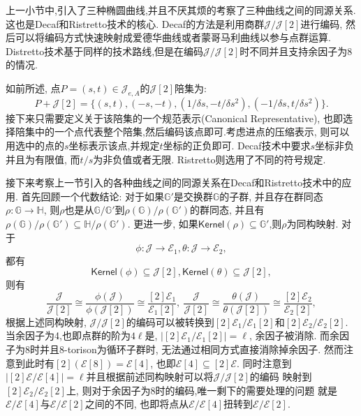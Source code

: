 \documentclass{article}
\renewcommand{\G}{\mathbb{G}}
\newcommand{\E}{\mathcal{E}}
\newcommand{\J}{\mathcal{J}}
\newcommand{\Kernel}{\textsf{Kernel}}
\begin{document}
上一小节中,引入了三种椭圆曲线,并且不厌其烦的考察了三种曲线之间的同源关系.
这也是Decaf和Ristretto技术的核心. Decaf的方法是利用商群$\J/\J[2]$进行编码,
然后可以将编码方式快速映射成爱德华曲线或者蒙哥马利曲线以参与点群运算. 
Distretto技术基于同样的技术路线,但是在编码$\J/\J[2]$时不同并且支持余因子为8的情况.

如前所述, 点$P = (s,t) \in \J_{e, A}$的$\J[2]$陪集为:
$$
P + \J[2] = \{(s,t), (-s, -t), (1/\delta s, -t/\delta s^2), (-1 / \delta s, t / \delta s^2) \}.
$$
接下来只需要定义关于该陪集的一个规范表示(Canonical Representative), 
也即选择陪集中的一个点代表整个陪集,然后编码该点即可.考虑进点的压缩表示,
则可以用选中的点的$s$坐标表示该点,并规定$t$坐标的正负即可.
Decaf技术中要求$s$坐标非负并且为有限值, 而$t/s$为非负值或者无限.
Ristretto则选用了不同的符号规定.

接下来考察上一节引入的各种曲线之间的同源关系在Decaf和Ristretto技术中的应用.
首先回顾一个代数结论: 对于如果$\G'$是交换群$\G$的子群, 并且存在群同态
$\rho: \G \rightarrow \mathbb{H}$, 则$\rho$也是从$\G/\G'$到$\rho(\G)/\rho(\G')$的群同态,
并且有$\rho(\G)/\rho(\G') \subseteq \mathbb{H}/\rho(\G')$.
更进一步, 如果$\Kernel(\rho) \subseteq \G'$,则$\rho$为同构映射.
对于
$$\phi: \J \rightarrow \E_1, \theta: \J \rightarrow \E_2,$$ 
都有
$$\Kernel(\phi) \subseteq \J[2], \Kernel(\theta) \subseteq \J[2],$$
则有
$$
\frac{\J}{\J[2]} \cong \frac{\phi(\J)}{\phi(\J[2])} \cong \frac{[2]\E_1}{\E_1[2]}, \ 
\frac{\J}{\J[2]} \cong \frac{\theta(\J)}{\theta(\J[2])} \cong \frac{[2]\E_2}{\E_2[2]},
$$
根据上述同构映射, $\J/\J[2]$的编码可以被转换到$[2]\E_1/\E_1[2]$和$[2]\E_2/\E_2[2]$.
当余因子为4,也即点群的阶为$4\ell$是, $|[2]\E_1/\E_1[2]| = \ell$, 余因子被消除.
而余因子为8时并且8-torison为循环子群时, 无法通过相同方式直接消除掉余因子.
然而注意到此时有$[2](\E[8]) = \E[4]$, 也即$\E[4] \subseteq [2]\E$. 
同时注意到$|[2]\E/\E[4]| = \ell$并且根据前述同构映射可以将$\J/\J[2]$的编码
映射到$[2]\E_2/\E_2[2]$上, 则对于余因子为8时的编码,唯一剩下的需要处理的问题
就是$\E/\E[4]$与$\E/\E[2]$之间的不同, 也即将点从$\E/\E[4]$扭转到$\E/\E[2]$.
\end{document}

